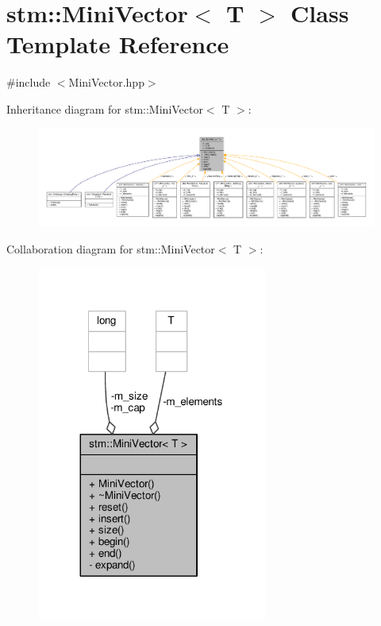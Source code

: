 \hypertarget{classstm_1_1MiniVector}{\section{stm\-:\-:Mini\-Vector$<$ T $>$ Class Template Reference}
\label{classstm_1_1MiniVector}
}


{\ttfamily \#include $<$Mini\-Vector.\-hpp$>$}



Inheritance diagram for stm\-:\-:Mini\-Vector$<$ T $>$\-:
\nopagebreak
\begin{figure}[H]
\begin{center}
\leavevmode
\includegraphics[width=350pt]{classstm_1_1MiniVector__inherit__graph}
\end{center}
\end{figure}


Collaboration diagram for stm\-:\-:Mini\-Vector$<$ T $>$\-:
\nopagebreak
\begin{figure}[H]
\begin{center}
\leavevmode
\includegraphics[width=215pt]{classstm_1_1MiniVector__coll__graph}
\end{center}
\end{figure}
